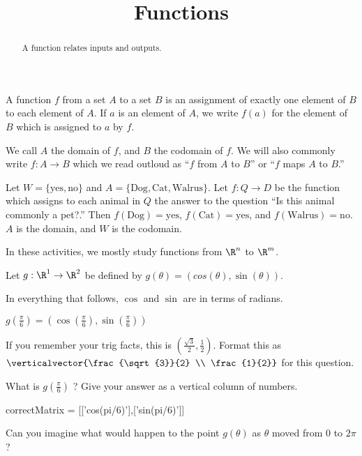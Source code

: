 \documentclass{ximera}
\title{Functions}
\begin{document}
\begin{abstract}
  A function relates inputs and outputs.
\end{abstract}

\begin{definition}
  A function $f$ from a set $A$ to a set $B$ is an assignment of
  exactly one element of $B$ to each element of $A$.  If $a$ is an
  element of $A$, we write $f(a)$ for the element of $B$ which is
  assigned to $a$ by $f$.
\end{definition}

We call $A$ the domain of $f$, and $B$ the codomain of $f$.  We will
also commonly write $f:A \to B$ which we read outloud as ``$f$ from
$A$ to $B$'' or ``$f$ maps $A$ to $B$.''

\begin{example}
  Let $W =\{ \text{yes},\text{no}\}$ and $A = \{ \text{Dog},
  \text{Cat}, \text{Walrus}\}$.  Let $f:Q \to D$ be the function which
  assigns to each animal in $Q$ the answer to the question ``Is this
  animal commonly a pet?.''  Then $f(\text{Dog}) = \text{yes}$,
  $f(\text{Cat}) = \text{yes}$, and $f(\text{Walrus}) =
  \text{no}$.  $A$ is the domain, and $W$ is the codomain.
\end{example}

In these activities, we mostly study functions from $\R^n$ to $\R^m$.

\begin{question}
  Let $g:\R^1 \to \R^2$ be defined by $g(\theta) = (cos(\theta),\sin(\theta))$.
  \begin{solution}
    \begin{hint}
      \begin{warning}
        In everything that follows, $\cos$ and $\sin$ are in terms of radians.
      \end{warning}
    \end{hint}
    \begin{hint}
      $g(\frac{\pi}{6}) = (\cos(\frac{\pi}{6}),\sin(\frac{\pi}{6}))$
    \end{hint}
    \begin{hint}
      If you remember your trig facts, this is
      $(\frac{\sqrt{3}}{2},\frac{1}{2})$.  Format this as
      $\verticalvector{\frac{\sqrt{3}}{2} \\ \frac{1}{2}}$ for
      this question.
    \end{hint}
    What is $g(\frac{\pi}{6})$ ?  Give your answer as a vertical column of numbers.
    \begin{matrix-answer}
      correctMatrix = [['cos(pi/6)'],['sin(pi/6)']]
    \end{matrix-answer}
  \end{solution}
  
  Can you imagine what would happen to the point $g(\theta)$ as $\theta$ moved from $0$ to $2\pi$?
\end{question}
\end{document}
